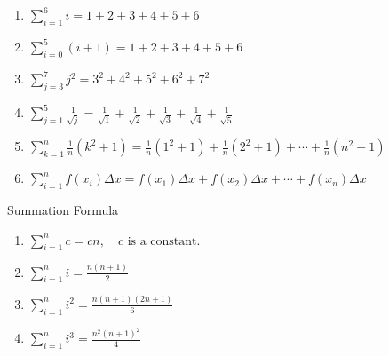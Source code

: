 \documentclass[12pt]{article}
\theoremstyle{beautifulthm}
\begin{document}
\begin{tcolorbox}[colback=examplebg, colframe=red!75!black, title=\textbf{EXAMPLE 1: Examples of Sigma Notation}, fonttitle=\bfseries, sharp corners]

\begin{enumerate}
    \item[a.] \( \sum_{i=1}^{6} i = 1 + 2 + 3 + 4 + 5 + 6 \)
    
    \item[b.] \( \sum_{i=0}^{5} (i + 1) = 1 + 2 + 3 + 4 + 5 + 6 \)
    
    \item[c.] \( \sum_{j=3}^{7} j^2 = 3^2 + 4^2 + 5^2 + 6^2 + 7^2 \)
    
    \item[d.] \( \sum_{j=1}^{5} \frac{1}{\sqrt{j}} = \frac{1}{\sqrt{1}} + \frac{1}{\sqrt{2}} + \frac{1}{\sqrt{3}} + \frac{1}{\sqrt{4}} + \frac{1}{\sqrt{5}} \)
    
    \item[e.] \( \sum_{k=1}^{n} \frac{1}{n}(k^2 + 1) = \frac{1}{n}(1^2 + 1) + \frac{1}{n}(2^2 + 1) + \cdots + \frac{1}{n}(n^2 + 1) \)
    
    \item[f.] \( \sum_{i=1}^{n} f(x_i) \Delta x = f(x_1) \Delta x + f(x_2) \Delta x + \cdots + f(x_n) \Delta x \)
\end{enumerate}
\end{tcolorbox}


\newpage
\begin{mytheorem}{Summation Formula}{}
 
\begin{enumerate}
    \item \(\sum_{i=1}^n c = cn, \quad c \text{ is a constant.}\)
    \item \(\sum_{i=1}^n i = \frac{n(n+1)}{2}\)
    \item \(\sum_{i=1}^n i^2 = \frac{n(n+1)(2n+1)}{6}\)
    \item \(\sum_{i=1}^n i^3 = \frac{n^2(n+1)^2}{4}\)
\end{enumerate}
   
\end{mytheorem}
\end{document}
